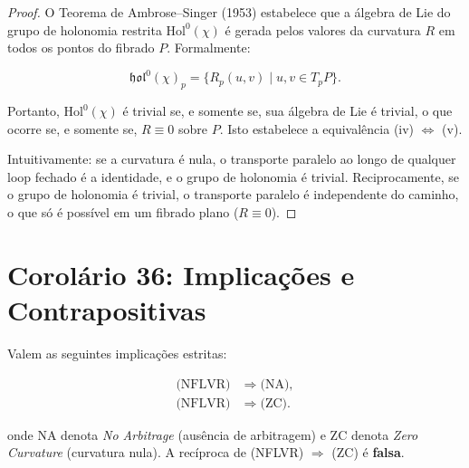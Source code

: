 \begin{proof}
O Teorema de Ambrose--Singer (1953) estabelece que a \'algebra de Lie do grupo de holonomia restrita $\mathrm{Hol}^0(\chi)$ \'e gerada pelos valores da curvatura $R$ em todos os pontos do fibrado $P$. Formalmente:

\begin{equation}
\mathfrak{hol}^0(\chi)_p = \{ R_p(u, v) \mid u, v \in T_pP \}.
\end{equation}

\noindent Portanto, $\mathrm{Hol}^0(\chi)$ \'e trivial se, e somente se, sua \'algebra de Lie \'e trivial, o que ocorre se, e somente se, $R \equiv 0$ sobre $P$. Isto estabelece a equival\^encia (iv) $\Longleftrightarrow$ (v).

Intuitivamente: se a curvatura \'e nula, o transporte paralelo ao longo de qualquer loop fechado \'e a identidade, e o grupo de holonomia \'e trivial. Reciprocamente, se o grupo de holonomia \'e trivial, o transporte paralelo \'e independente do caminho, o que s\'o \'e poss\'ivel em um fibrado plano ($R \equiv 0$).
\end{proof}

\section{Corol\'ario 36: Implica\c{c}\~oes e Contrapositivas}

\begin{coro}
Valem as seguintes implica\c{c}\~oes estritas:

\begin{align}
\text{(NFLVR)} &\Longrightarrow \text{(NA)}, \\
\text{(NFLVR)} &\Longrightarrow \text{(ZC)}.
\end{align}

onde NA denota \textit{No Arbitrage} (aus\^encia de arbitragem) e ZC denota \textit{Zero Curvature} (curvatura nula). A rec\'iproca de (NFLVR) $\Longrightarrow$ (ZC) \'e \textbf{falsa}.
\end{coro}

